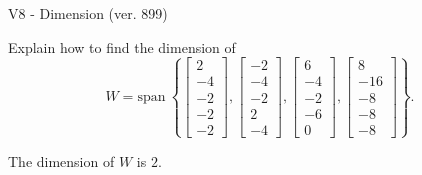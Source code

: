 \begin{exercise}
  \begin{exerciseTitle}V8 - Dimension (ver. 899)\end{exerciseTitle}
  \begin{exerciseStatement}
    Explain how to find the dimension of 
\[W=\mathrm{span}\ \left\{\left[\begin{array}{r}
2 \\
-4 \\
-2 \\
-2 \\
-2
\end{array}\right] , \left[\begin{array}{r}
-2 \\
-4 \\
-2 \\
2 \\
-4
\end{array}\right] , \left[\begin{array}{r}
6 \\
-4 \\
-2 \\
-6 \\
0
\end{array}\right] , \left[\begin{array}{r}
8 \\
-16 \\
-8 \\
-8 \\
-8
\end{array}\right]\right\}.\]



  \end{exerciseStatement}
  \begin{exerciseAnswer}
   The dimension of \(W\) is  \(2\).
  


  \end{exerciseAnswer}
\end{exercise}